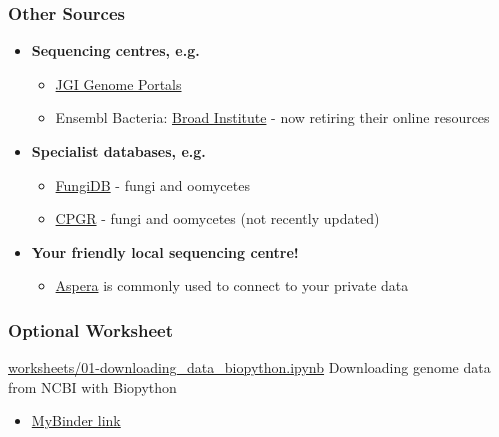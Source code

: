 \begin{frame}
  \frametitle{Other Sources}
    \begin{itemize}
      \item \textcolor{hutton_green}{\textbf{Sequencing centres, e.g.}}
      \begin{itemize}
        \item \textcolor{hutton_purple}{\href{http://genome.jgi.doe.gov/}{JGI Genome Portals}}
        \item Ensembl Bacteria: \textcolor{hutton_purple}{\href{https://www.broadinstitute.org/}{Broad Institute}} - now retiring their online resources
      \end{itemize}
      \item \textcolor{hutton_blue}{\textbf{Specialist databases, e.g.}}
      \begin{itemize}
        \item \textcolor{hutton_purple}{\href{http://fungidb.org/fungidb/}{FungiDB}} - fungi and oomycetes
        \item \textcolor{hutton_purple}{\href{http://cpgr.plantbiology.msu.edu/}{CPGR}} - fungi and oomycetes (not recently updated)
      \end{itemize}
      \item \textcolor{RawSienna}{\textbf{Your friendly local sequencing centre!}}
      \begin{itemize}
        \item \textcolor{hutton_purple}{\href{http://asperasoft.com/}{Aspera}} is commonly used to connect to your private data
      \end{itemize}
    \end{itemize}
\end{frame}

\begin{frame}
  \frametitle{Optional Worksheet}
  \begin{alertblock}{\url{worksheets/01-downloading_data_biopython.ipynb}}
    Downloading genome data from NCBI with Biopython
  \end{alertblock}
  \begin{itemize}
    \item \textcolor{hutton_purple}{\href{http://mybinder.org/repo/widdowquinn/Teaching-EMBL-Plant-Path-Genomics}{MyBinder link}}
  \end{itemize}
\end{frame}